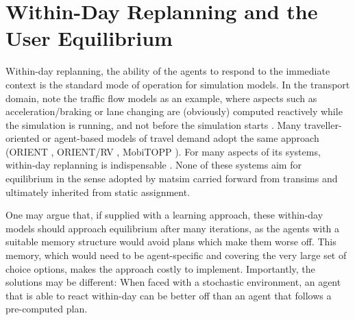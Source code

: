 


\section{Within-Day Replanning and the User Equilibrium}
\label{sec:researchavenues-withinday}
Within-day replanning, \ie the ability of the agents to respond to the immediate context is the standard mode of operation for simulation models. 
%
In the transport domain, note the traffic flow models as an example, where aspects such as acceleration/braking or lane changing are (obviously) computed reactively while the simulation is running, and not before the simulation starts \citep[e.g.][]{Wiedemann_PhDThesis_1974}.
%
Many traveller-oriented or agent-based models of travel demand adopt the same approach (ORIENT \citep[][]{Sparmann_TechRep_1980}, ORIENT/RV \citep{AxhausenHerz_JTE_1989}, MobiTOPP \citep[][]{SchnittgerZumkeller_ETC_2004}).
%
For many aspects of \acrfull{its} systems, within-day replanning is indispensable \citep[e.g.][]{hall-1993,EmmerinkEtAl_TransResC_1995,Dobler_PhDThesis_2013}.
%
None of these systems aim for equilibrium in the sense adopted by \gls{matsim} carried forward from \gls{transims} and ultimately inherited from static assignment.

One may argue that, if supplied with a learning approach, these within-day models should approach equilibrium after many iterations, as the agents with a suitable memory structure would avoid plans which make them worse off. 
%
This memory, which would need to be agent-specific and covering the very large set of choice options, makes the approach costly to implement.
%
Importantly, the solutions may be different: When faced with a stochastic environment, an agent that is able to react within-day can be better off than an agent that follows a pre-computed plan. \kai{!!!}


